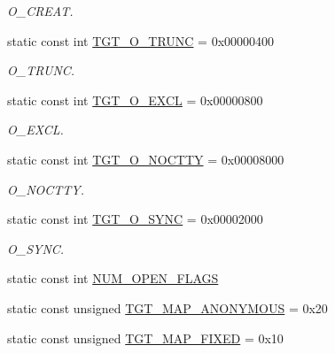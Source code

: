 \begin{DoxyCompactItemize}
\begin{DoxyCompactList}\small\item\em O\_\-CREAT. \item\end{DoxyCompactList}\item 
static const int \hyperlink{classSparcLinux_a4f892ee6e1424a2becd859b0bef1f18b}{TGT\_\-O\_\-TRUNC} = 0x00000400
\begin{DoxyCompactList}\small\item\em O\_\-TRUNC. \item\end{DoxyCompactList}\item 
static const int \hyperlink{classSparcLinux_a10d5d118d15b51ebdd4b16dc78342d1d}{TGT\_\-O\_\-EXCL} = 0x00000800
\begin{DoxyCompactList}\small\item\em O\_\-EXCL. \item\end{DoxyCompactList}\item 
static const int \hyperlink{classSparcLinux_adfd4240281579e5f60c5e22c601225d8}{TGT\_\-O\_\-NOCTTY} = 0x00008000
\begin{DoxyCompactList}\small\item\em O\_\-NOCTTY. \item\end{DoxyCompactList}\item 
static const int \hyperlink{classSparcLinux_abf43ab05d2a5b6b8113952160d8565db}{TGT\_\-O\_\-SYNC} = 0x00002000
\begin{DoxyCompactList}\small\item\em O\_\-SYNC. \item\end{DoxyCompactList}\item 
static const int \hyperlink{classSparcLinux_ad85b9918c8f2c8739537a002dc1dc526}{NUM\_\-OPEN\_\-FLAGS}
\item 
static const unsigned \hyperlink{classSparcLinux_a0bbc267200567dd98250b99b6085a499}{TGT\_\-MAP\_\-ANONYMOUS} = 0x20
\item 
static const unsigned \hyperlink{classSparcLinux_a0124e421d7846143bca15728b7a53e14}{TGT\_\-MAP\_\-FIXED} = 0x10
\end{DoxyCompactItemize}

